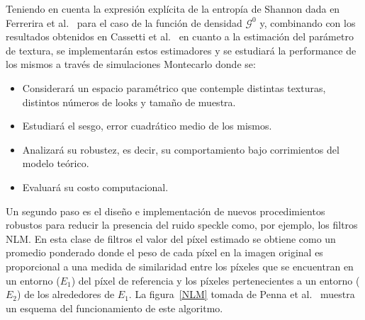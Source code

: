 \documentclass[11pt]{article}
\begin{document}
 Teniendo en cuenta la expresión explícita de la entropía de Shannon dada en Ferrerira et al.~\cite{Ferreira2020} para el caso de la función de densidad $\mathcal{G}^0$ y, combinando con los resultados obtenidos en Cassetti et al.~\cite{Cassetti2020} en cuanto a la estimación del parámetro de textura, se implementarán estos estimadores y se estudiará la performance de los mismos a través de simulaciones Montecarlo donde se:
\begin{itemize}
	\item Considerará un espacio paramétrico que contemple distintas texturas, distintos números de looks y tamaño de muestra.
	\item Estudiará el sesgo, error cuadrático medio de los mismos.
	\item Analizará su robustez, es decir, su comportamiento bajo corrimientos del modelo teórico. 
	\item Evaluará su costo computacional.
\end{itemize} 


Un segundo paso es el diseño e implementación de nuevos procedimientos robustos para reducir la presencia del ruido speckle como, por ejemplo, los filtros NLM. En esta clase de filtros el valor del píxel estimado se obtiene como un promedio ponderado donde el peso de cada píxel en la imagen original es proporcional a una medida de similaridad entre los píxeles que se encuentran en
un entorno ($E_1$) del píxel de referencia y los píxeles pertenecientes a un entorno ($E_2$) de los alrededores de $E_1$. La figura~\ref{NLM} tomada de Penna et al.~\cite{Penna2013} muestra un esquema del funcionamiento de este algoritmo. 
\end{document}
